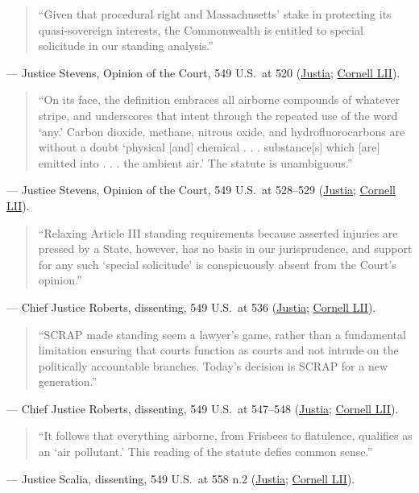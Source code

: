 \documentclass[12pt]{article}
\begin{document}
\begin{quote}
``Given that procedural right and Massachusetts' stake in protecting its quasi-sovereign interests, the Commonwealth is entitled to special solicitude in our standing analysis.''
\end{quote}
\noindent --- Justice Stevens, Opinion of the Court, 549 U.S.\ at 520 (\href{https://supreme.justia.com/cases/federal/us/549/497/}{Justia}; \href{https://www.law.cornell.edu/supct/html/05-1120.ZO.html}{Cornell LII}).

\begin{quote}
``On its face, the definition embraces all airborne compounds of whatever stripe, and underscores that intent through the repeated use of the word `any.' Carbon dioxide, methane, nitrous oxide, and hydrofluorocarbons are without a doubt `physical [and] chemical . . . substance[s] which [are] emitted into . . . the ambient air.' The statute is unambiguous.''
\end{quote}
\noindent --- Justice Stevens, Opinion of the Court, 549 U.S.\ at 528--529 (\href{https://supreme.justia.com/cases/federal/us/549/497/}{Justia}; \href{https://www.law.cornell.edu/supct/html/05-1120.ZO.html}{Cornell LII}).

\begin{quote}
``Relaxing Article III standing requirements because asserted injuries are pressed by a State, however, has no basis in our jurisprudence, and support for any such `special solicitude' is conspicuously absent from the Court's opinion.''
\end{quote}
\noindent --- Chief Justice Roberts, dissenting, 549 U.S.\ at 536 (\href{https://supreme.justia.com/cases/federal/us/549/497/}{Justia}; \href{https://www.law.cornell.edu/supct/html/05-1120.ZD.html}{Cornell LII}).

\begin{quote}
``SCRAP made standing seem a lawyer's game, rather than a fundamental limitation ensuring that courts function as courts and not intrude on the politically accountable branches. Today's decision is SCRAP for a new generation.''
\end{quote}
\noindent --- Chief Justice Roberts, dissenting, 549 U.S.\ at 547--548 (\href{https://supreme.justia.com/cases/federal/us/549/497/}{Justia}; \href{https://www.law.cornell.edu/supct/html/05-1120.ZD.html}{Cornell LII}).

\begin{quote}
``It follows that everything airborne, from Frisbees to flatulence, qualifies as an `air pollutant.' This reading of the statute defies common sense.''
\end{quote}
\noindent --- Justice Scalia, dissenting, 549 U.S.\ at 558 n.2 (\href{https://supreme.justia.com/cases/federal/us/549/497/}{Justia}; \href{https://www.law.cornell.edu/supct/html/05-1120.ZD1.html}{Cornell LII}).
\end{document}
